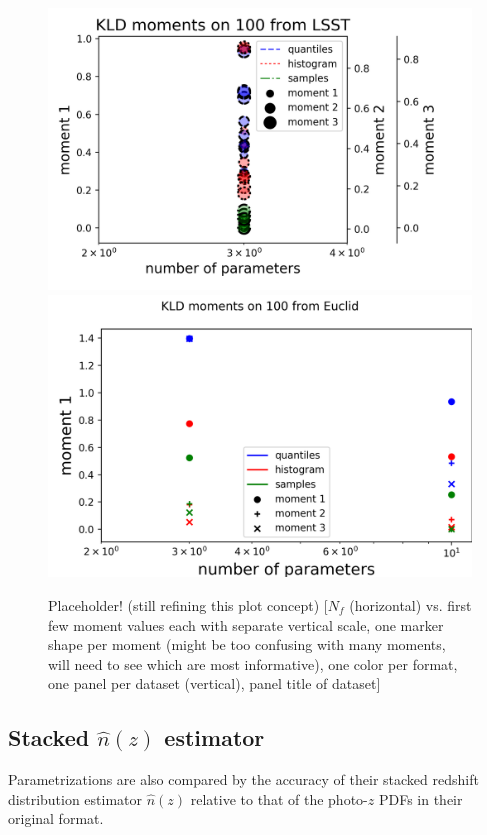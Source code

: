 \documentclass[\docopts]{\docclass}
\newcommand{\pz}{photo-$z$ PDF}
\begin{document}
\begin{figure}
  \includegraphics[width=0.9\columnwidth]{lsst_moments_placeholder.png}\\
  \includegraphics[width=0.9\columnwidth]{euclid_moments_placeholder.png}
  \caption{Placeholder!  (still refining this plot concept)  [$N_{f}$ 
(horizontal) vs. first few moment values each with separate vertical scale, one 
marker shape per moment (might be too confusing with many moments, will need to 
see which are most informative), one color per format, one panel per dataset 
(vertical), panel title of dataset]
  \label{fig:moments}}
\end{figure}


\subsection{Stacked $\hat{n}(z)$ estimator}
\label{sec:stacked}

Parametrizations are also compared by the accuracy of their stacked redshift 
distribution estimator $\hat{n}(z)$ relative to that of the \pz s in their 
original format.
\end{document}
